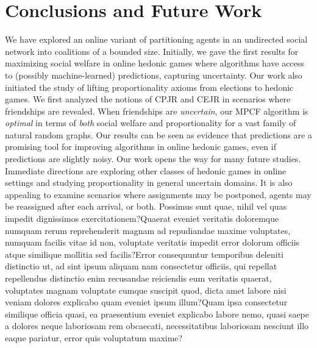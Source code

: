 \documentclass[letterpaper]{article}
\begin{document}
\vspace{-3.58mm}
\section{Conclusions and Future Work}
\label{sec:Conclusions and Future Work}
We have explored an online variant of partitioning agents in an undirected social network into coalitions of a bounded size. Initially, we gave the first results for maximizing social welfare in online hedonic games where algorithms have access to (possibly machine-learned) predictions, capturing uncertainty. Our work also initiated the study of lifting proportionality axioms from elections to hedonic games. We first analyzed the notions of CPJR and CEJR in scenarios where friendships are revealed. When friendships are \textit{uncertain}, our MPCF algorithm is \textit{optimal} in terms of \textit{both} social welfare and proportionality for a vast family of natural random graphs. Our results can be seen as evidence that 
predictions are a promising tool for improving algorithms in online hedonic games, even if predictions are slightly noisy.   Our work opens the way for many future studies. Immediate directions are exploring other classes of hedonic games in online settings and studying proportionality in general uncertain domains. It is also appealing to examine scenarios where assignments may be postponed, agents may be reassigned after each arrival, or both.  Possimus sunt quae, nihil vel quas impedit dignissimos exercitationem?Quaerat eveniet veritatis doloremque numquam rerum reprehenderit magnam ad repudiandae maxime voluptates, numquam facilis vitae id non, voluptate veritatis impedit error dolorum officiis atque similique mollitia sed facilis?Error consequuntur temporibus deleniti distinctio ut, ad sint ipsum aliquam nam consectetur officiis, qui repellat repellendus distinctio enim recusandae reiciendis eum veritatis quaerat, voluptates magnam voluptate cumque suscipit quod, dicta amet labore nisi veniam dolores explicabo quam eveniet ipsum illum?Quam ipsa consectetur similique officia quasi, ea praesentium eveniet explicabo labore nemo, quasi saepe a dolores neque laboriosam rem obcaecati, necessitatibus laboriosam nesciunt illo eaque pariatur, error quis voluptatum maxime?\clearpage

\end{document}
